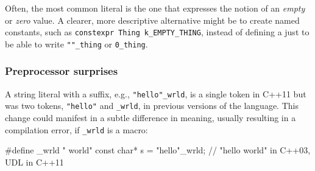 \noindent Often, the most common literal is the one that expresses the notion of
an \emph{empty} or \emph{zero} value. A clearer, more descriptive alternative might be to create named constants, such as  \lstinline!constexpr!~\lstinline!Thing!~\lstinline!k_EMPTY_THING!, instead of
defining a  just to be able to write
\lstinline!""_thing! or \lstinline!0_thing!.


%
%

\subsubsection[Preprocessor surprises]{Preprocessor surprises}\label{preprocessor-surprises}

A string literal with a suffix, e.g., \lstinline!"hello"_wrld!, is a
single token in C++11 but was two tokens, \lstinline!"hello"! and
\lstinline!_wrld!, in previous versions of the language. This change could
manifest in a subtle difference in meaning, usually resulting in a
compilation error, if \lstinline!_wrld! is a macro:

\begin{emcppslisting}[emcppserrorlines=2]
#define _wrld " world"
const char* s = "hello"_wrld;  // "hello world" in C++03, UDL in C++11
\end{emcppslisting}

